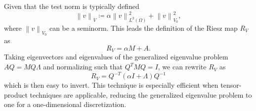\documentclass{article}
\newcommand{\nor}[1]{\left\| #1 \right\|}
\newcommand{\LRp}[1]{\left( #1 \right)}
\newcommand{\LRs}[1]{\left[ #1 \right]}
\newcommand{\LRa}[1]{\left\langle #1 \right\rangle}
\newcommand{\jump}[1] {\ensuremath{\LRs{\![#1]\!}}}
\renewcommand{\L}{L^2\LRp{\Omega}}
\begin{document}
Given that the test norm is typically defined
\[
\nor{v}_V \coloneqq \alpha\nor{v}_{\L}^2 + \nor{v}_{V_0}^2,
\]
where $\nor{v}_{V_0}$ can be a seminorm.  This leads the definition of the Riesz map $R_V$ as
\[
R_V = \alpha M + A.
\]
Taking eigenvectors and eigenvalues of the generalized eigenvalue problem $AQ = MQ \Lambda$ and normalizing such that $Q^TMQ = I$, we can rewrite $R_V$ as
\[
R_V = Q^{-T} (\alpha I + \Lambda) Q^{-1}
\]
which is then easy to invert.  This technique is especially efficient when tensor-product techniques are applicable, reducing the generalized eigenvalue problem to one for a one-dimensional discretization.  

%
%
%
%
\end{document}
